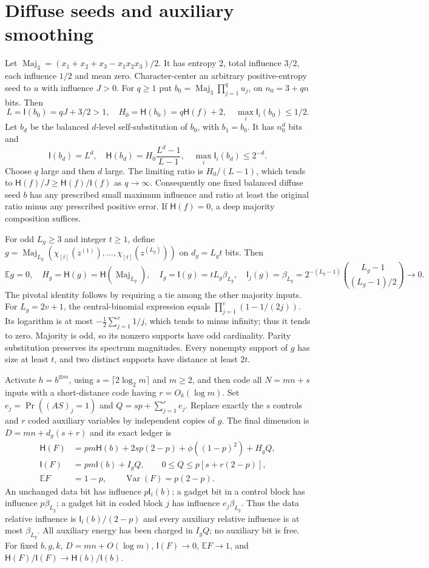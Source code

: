 \documentclass[11pt]{article}
\newcommand{\I}{\mathsf I}\newcommand{\HH}{\mathsf H}
\newcommand{\Var}{\operatorname{Var}}
\newcommand{\E}{\mathbb E}
\begin{document}
\section{Diffuse seeds and auxiliary smoothing}
Let $\operatorname{Maj}_3=(x_1+x_2+x_3-x_1x_2x_3)/2$.
It has entropy $2$, total influence $3/2$, each influence $1/2$ and mean zero.
Character-center an arbitrary positive-entropy seed to $u$ with influence $J>0$.
For $q\ge1$ put $b_0=\operatorname{Maj}_3\prod_{j=1}^q u_j$,
on $n_0=3+qn$ bits. Then
\[
 L=\I(b_0)=qJ+3/2>1,\quad H_0=\HH(b_0)=q\HH(f)+2,
 \quad \max_i\I_i(b_0)\le1/2.
\]
Let $b_d$ be the balanced $d$-level self-substitution of $b_0$,
with $b_1=b_0$. It has $n_0^d$ bits and
\[
 \I(b_d)=L^d,\quad
 \HH(b_d)=H_0\frac{L^d-1}{L-1},\quad
 \max_i\I_i(b_d)\le2^{-d}.
\]
Choose $q$ large and then $d$ large. The limiting ratio is
$H_0/(L-1)$, which tends to $\HH(f)/J\ge\HH(f)/\I(f)$ as $q\to\infty$.
Consequently one fixed balanced diffuse seed $b$ has any prescribed small
maximum influence and ratio at least the original ratio minus any prescribed
positive error. If $\HH(f)=0$, a deep majority composition suffices.

For odd $L_g\ge3$ and integer $t\ge1$, define
$g=\operatorname{Maj}_{L_g}(\chi_{[t]}(z^{(1)}),\ldots,
\chi_{[t]}(z^{(L_g)}))$ on $d_g=L_gt$ bits. Then
\[
 \E g=0,\quad H_g=\HH(g)=\HH(\operatorname{Maj}_{L_g}),\quad
 I_g=\I(g)=tL_g\beta_{L_g},\quad
 \I_j(g)=\beta_{L_g}=2^{-(L_g-1)}\binom{L_g-1}{(L_g-1)/2}\to0.
\]
The pivotal identity follows by requiring a tie among the other majority inputs.
For $L_g=2v+1$, the central-binomial expression equals
$\prod_{j=1}^v(1-1/(2j))$. Its logarithm is at most
$-\tfrac12\sum_{j=1}^v1/j$, which tends to minus infinity; thus it tends to zero.
Majority is odd, so its nonzero supports have odd cardinality.
Parity substitution preserves its spectrum magnitudes. Every nonempty support
of $g$ has size at least $t$, and two distinct supports have distance at least $2t$.

Activate $h=b^{\otimes m}$, using $s=\lceil2\log_2m\rceil$ and $m\ge2$,
and then code all $N=mn+s$ inputs with a short-distance code having $r=O_k(\log m)$.
Set $e_j=\Pr((AS)_j=1)$ and $Q=sp+\sum_{j=1}^r e_j$.
Replace exactly the $s$ controls and $r$ coded auxiliary variables by independent
copies of $g$. The final dimension is $D=mn+d_g(s+r)$ and its exact ledger is
\[
\begin{split}
 \HH(F)&=pm\HH(b)+2sp(2-p)+\phi((1-p)^2)+H_gQ,\\
 \I(F)&=pm\I(b)+I_gQ,\qquad 0\le Q\le p[s+r(2-p)],\\
 \E F&=1-p,\qquad\Var(F)=p(2-p).
\end{split}
\]
An unchanged data bit has influence $p\I_i(b)$; a gadget bit in a control block
has influence $p\beta_{L_g}$; a gadget bit in coded block $j$ has influence
$e_j\beta_{L_g}$. Thus the data relative influence is
$\I_i(b)/(2-p)$ and every auxiliary relative influence is at most $\beta_{L_g}$.
All auxiliary energy has been charged in $I_gQ$; no auxiliary bit is free.
For fixed $b,g,k$, $D=mn+O(\log m)$,
$\I(F)\to0$, $\E F\to1$, and
$\HH(F)/\I(F)\to\HH(b)/\I(b)$.
\end{document}
